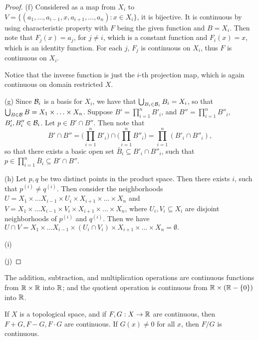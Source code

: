 \documentclass[11pt,a4paper]{article}
\begin{document}
\begin{proof}
\noindent(f) \forward Considered as a map from $X_i$ to $V = \{(a_1,\ldots,a_{i-1},x,a_{i+1},\ldots,a_n):x\in X_i\}$, it is bijective. It is continuous by using characteristic property with $F$ being the given function and $B = X_i$. Then note that $F_j(x) = a_j$, for $j\neq i$, which is a constant function and $F_i(x) = x$, which is an identity function. For each $j$, $F_j$ is continuous on $X_i$, thus $F$ is continuous on $X_i$.

\noindent\converse Notice that the inverse function is just the $i$-th projection map, which is again continuous on domain restricted $X$.

\noindent(g) Since $\mathcal{B}_i$ is a basis for $X_i$, we have that $\bigcup_{B_i\in\mathcal{B}_i}B_i = X_i$, so that $\bigcup_{B\in\mathcal{B}}B = X_1\times\ldots\times X_n$. Suppose $B' = \prod_{i=1}^n B'_i$, and $B'' = \prod_{i=1}^n B''_i$, $B'_i,B''_i\in\mathcal{B}_i$. Let $p\in B'\cap B''$. Then note that $$B'\cap B'' = \Big(\prod_{i=1}^n B'_i\Big)\cap \Big(\prod_{i=1}^n B''_i\Big) = \prod_{i=1}^n (B'_i\cap B''_i),$$
so that there exists a basic open set $\bar{B}_i\subseteq B'_i\cap B''_i$, such that $p\in \prod_{i=1}^n \bar{B}_i\subseteq B'\cap B''$.

\noindent(h) Let $p,q$ be two distinct points in the product space. Then there exists $i$, such that $p^{(i)}\neq q^{(i)}$. Then consider the neighborhoods $U = X_1\times\ldots X_{i-1}\times U_i \times X_{i+1}\times\ldots\times X_n$ and $V = X_1\times\ldots X_{i-1}\times V_i \times X_{i+1}\times\ldots\times X_n$, where $U_i,V_i\subseteq X_i$ are disjoint neighborhoods of $p^{(i)}$ and $q^{(i)}$. Then we have $U\cap V = X_1\times\ldots X_{i-1}\times (U_i\cap V_i) \times X_{i+1}\times\ldots\times X_n = \emptyset.$

\noindent(i) 

\noindent(j) 
\end{proof}

\begin{lemma}
The addition, subtraction, and multiplication operations are continuous functions from $\mathbb{R}\times \mathbb{R}$ into $\mathbb{R}$; and the quotient operation is continuous from $\mathbb{R}\times(\mathbb{R}-\{0\})$ into $\mathbb{R}$.
\end{lemma}

\begin{proposition}
If $X$ is a topological space, and if $F,G:X\rightarrow \mathbb{R}$ are continuous, then $F+G,F-G,F\cdot G$ are continuous. If $G(x)\neq 0$ for all $x$, then $F/G$ is continuous.
\end{proposition}
\end{document}
